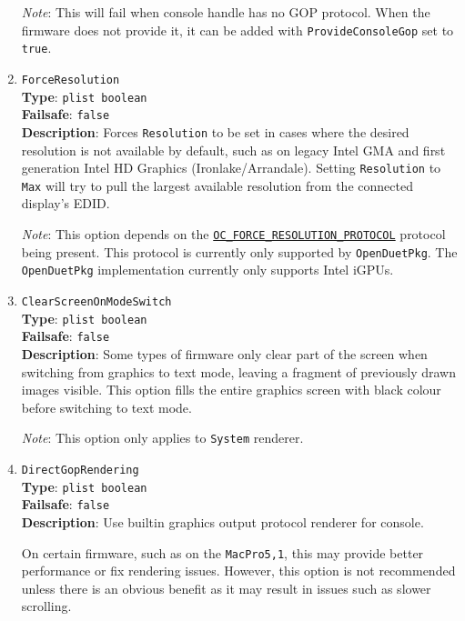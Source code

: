 \documentclass[]{article}
\begin{document}
\begin{enumerate}
  \emph{Note}: This will fail when console handle has no GOP protocol. When
  the firmware does not provide it, it can be added with \texttt{ProvideConsoleGop}
  set to \texttt{true}.

\item
  \texttt{ForceResolution}\\
  \textbf{Type}: \texttt{plist\ boolean}\\
  \textbf{Failsafe}: \texttt{false}\\
  \textbf{Description}: Forces \texttt{Resolution} to be set in cases where the desired
  resolution is not available by default, such as on legacy Intel GMA and first
  generation Intel HD Graphics (Ironlake/Arrandale). Setting \texttt{Resolution} to
  \texttt{Max} will try to pull the largest available resolution from the connected
  display's EDID.

  \emph{Note}: This option depends on the \href{https://github.com/acidanthera/OpenCorePkg/blob/master/Include/Acidanthera/Protocol/OcForceResolution.h}{\texttt{OC\_FORCE\_RESOLUTION\_PROTOCOL}}
  protocol being present. This protocol is currently only supported by \texttt{OpenDuetPkg}. The
  \texttt{OpenDuetPkg} implementation currently only supports Intel iGPUs.

\item
  \texttt{ClearScreenOnModeSwitch}\\
  \textbf{Type}: \texttt{plist\ boolean}\\
  \textbf{Failsafe}: \texttt{false}\\
  \textbf{Description}: Some types of firmware only clear part of the screen when switching
  from graphics to text mode, leaving a fragment of previously drawn images visible.
  This option fills the entire graphics screen with black colour before switching to
  text mode.

  \emph{Note}: This option only applies to \texttt{System} renderer.

\item
  \texttt{DirectGopRendering}\\
  \textbf{Type}: \texttt{plist\ boolean}\\
  \textbf{Failsafe}: \texttt{false}\\
  \textbf{Description}: Use builtin graphics output protocol renderer for console.

  On certain firmware, such as on the \texttt{MacPro5,1}, this may provide better
  performance or fix rendering issues. However, this option is not recommended unless
  there is an obvious benefit as it may result in issues such as slower scrolling.


\end{enumerate}
\end{document}
